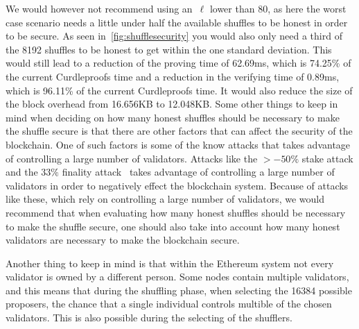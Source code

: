 We would however not recommend using an~$\ell$ lower than 80, as here the worst case scenario needs a little under half the available shuffles to be honest in order to be secure.
As seen in~\autoref{fig:shufflesecurity} you would also only need a third of the 8192 shuffles to be honest to get within the one standard deviation.
This would still lead to a reduction of the proving time of 62.69ms, which is 74.25\% of the current Curdleproofs time and a reduction in the verifying time of 0.89ms, which is 96.11\% of the current Curdleproofs time.
It would also reduce the size of the block overhead from 16.656KB to 12.048KB.
Some other things to keep in mind when deciding on how many honest shuffles should be necessary to make the shuffle secure is that there are other factors that can affect the security of the blockchain.
One of such factors is some of the know attacks that takes advantage of controlling a large number of validators.
Attacks like the $>-50\%$ stake attack and the $33\%$ finality attack~\cite{EthereumAttackDefense2024} takes advantage of controlling a large number of validators in order to negatively effect the blockchain system.
Because of attacks like these, which rely on controlling a large number of validators, we would recommend that when evaluating how many honest shuffles should be necessary to make the shuffle secure, one should also take into account how many honest validators are necessary to make the blockchain secure.

Another thing to keep in mind is that within the Ethereum system not every validator is owned by a different person.
Some nodes contain multiple validators, and this means that during the shuffling phase, when selecting the 16384 possible proposers, the chance that a single individual controls multible of the chosen validators.
This is also possible during the selecting of the shufflers.


